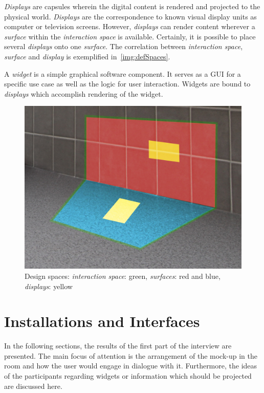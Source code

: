 {\emph{Displays}} are capsules wherein the digital content is rendered and projected to the physical world. \emph{Displays} are the correspondence to known visual display units as computer or television screens. However, \emph{displays} can render content wherever a \emph{surface} within the \emph{interaction space} is available. Certainly, it is possible to place several \emph{displays} onto one \emph{surface}. The correlation between \emph{interaction space}, \emph{surface} and \emph{display} is exemplified in~\autoref{img:defSpaces}.

A {\emph{widget}} is a simple graphical software component. It serves as a \ac{GUI} for a specific use case as well as the logic for user interaction. Widgets are bound to \emph{displays} which accomplish rendering of the widget. 

\begin{figure}[htbp]
\begin{center}
                \includegraphics[width=.6\textwidth]{images/interview/interactionspace.png}
 \captionsetup{width=0.6\textwidth}
\caption{Design spaces: \emph{interaction space}: green, \emph{surfaces}: red and blue, \emph{displays}: yellow}
\label{img:defSpaces}
\end{center}
\end{figure}


\section{Installations and Interfaces}\label{sec:interfacesINT}
In the following sections, the results of the first part of the interview are presented. The main focus of attention is the arrangement of the mock-up in the room and how the user would engage in dialogue with it. Furthermore, the ideas of the participants regarding widgets or information which should be projected are discussed here.


